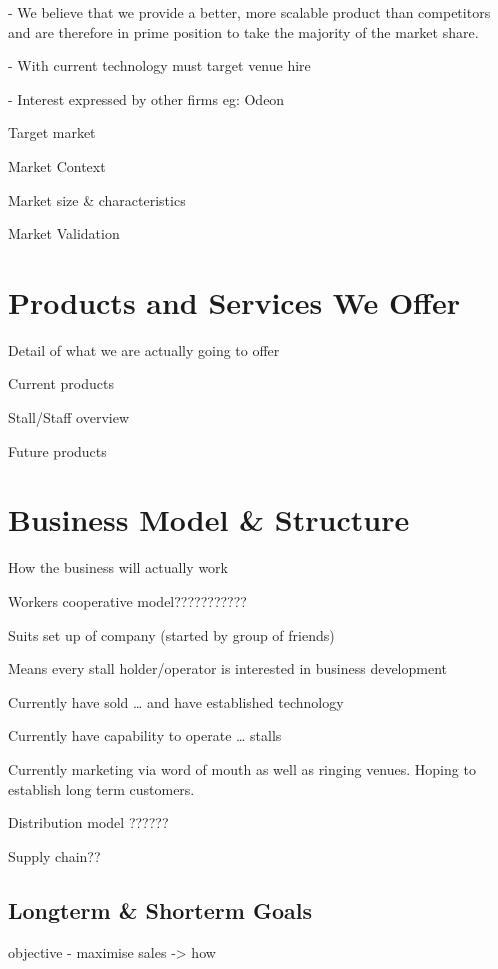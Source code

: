 \documentclass{article}
\begin{document}
 - We believe that we provide a better, more scalable product than
competitors and are therefore in prime position to take the majority
of the market share.

   - With current technology must target venue hire

   - Interest expressed by other firms eg: Odeon

  Target market

  Market Context

  Market size \& characteristics

  Market Validation


\section{Products and Services We Offer}
  Detail of what we are actually going to offer

  Current products

  Stall/Staff overview

  Future products



\section{Business Model \& Structure}
  How the business will actually work

Workers cooperative model???????????

Suits set up of company (started by group of friends)

Means every stall holder/operator is interested in business development

Currently have sold … and have established technology

Currently have capability to operate … stalls

Currently marketing via word of mouth as well as ringing venues.
Hoping to establish long term customers.

Distribution model ??????

Supply chain??

  \subsection{Longterm \& Shorterm Goals}

    objective - maximise sales -> how

\end{document}
